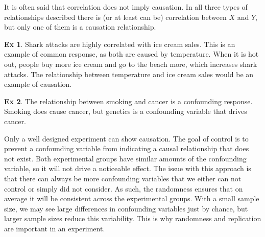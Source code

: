 \documentclass{article}
\theoremstyle{definition}\newtheorem{definition}{DEF}
\theoremstyle{definition}\newtheorem{example}{Ex}
\theoremstyle{lemma}\newtheorem{lemma}{Lemma}
\theoremstyle{corrolary}\newtheorem{corrolary}{Cor}
\begin{document}
It is often said that correlation does not imply causation.
In all three types of relationships described there is (or at least can be) correlation between $X$ and $Y$, but only one of them is a causation relationship.

\begin{example}
Shark attacks are highly correlated with ice cream sales.
This is an example of common response, as both are caused by temperature.
When it is hot out, people buy more ice cream and go to the beach more, which increases shark attacks.
The relationship between temperature and ice cream sales would be an example of causation.
\end{example}

\begin{example}
The relationship between smoking and cancer is a confounding response.
Smoking does cause cancer, but genetics is a confounding variable that drives cancer.
\end{example}

Only a well designed experiment can show causation.
The goal of control is to prevent a confounding variable from indicating a causal relationship that does not exist.
Both experimental groups have similar amounts of the confounding variable, so it will not drive a noticeable effect.
The issue with this approach is that there can always be more confounding variables that we either can not control or simply did not consider.
As such, the randomness ensures that on average it will be consistent across the experimental groups.
With a small sample size, we may see large differences in confounding variables just by chance, but larger sample sizes reduce this variability.
This is why randomness and replication are important in an experiment.
\end{document}
